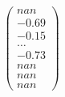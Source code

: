 \documentclass[preview]{standalone}
\begin{document}
\begin{align*}
\begin{pmatrix} nan \\ -0.69 \\ -0.15 \\ \dots \\ -0.73 \\ nan \\ nan \\ nan \end{pmatrix}
\end{align*}
\end{document}
